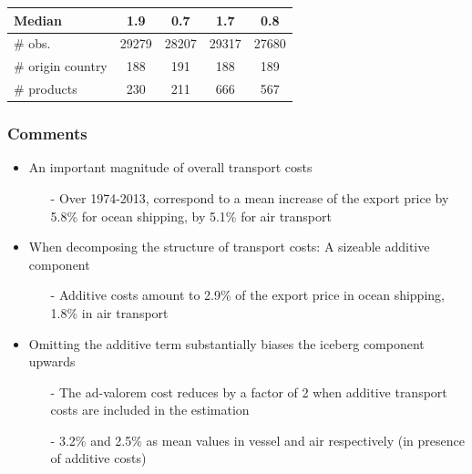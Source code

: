 \documentclass[10 pt,Helvetica, french]{beamer}
\begin{document}
\begin{frame}[label=slide_results_summary]
\begin{itemize}
\begin{table}[htbp]
{\begin{center}
\begin{tabular}{l|cc|cc}
    Median & 1.9 & 0.7 & 1.7 & 0.8 \\ \hline
        \# obs. & 29279 & 28207 & 29317 & 27680 \\
    \# origin country & 188 & 191 & 188 & 189 \\
    \# products & 230 & 211 & 666 & 567 \\  \hline \hline
  \end{tabular}
    \end{center}}
\end{table}%


\end{itemize}
\end{frame}

\begin{frame}
\frametitle{Comments}
\begin{itemize}
\item An important magnitude of overall transport costs  \vspace{0.1cm}
\begin{itemize}
\item[-] Over 1974-2013, correspond to a mean increase of the export price by 5.8\% for ocean shipping, by 5.1\% for air transport  \vspace{0.1cm}
\end{itemize}
\item When decomposing the structure of transport costs: A sizeable additive component   \vspace{0.1cm}
\begin{itemize}
\item[-] Additive costs amount to 2.9\% of the export price in ocean shipping, 1.8\% in air transport  \vspace{0.1cm}
\end{itemize}
\item Omitting the additive term substantially biases the iceberg component upwards  \vspace{0.1cm}
\begin{itemize}
\item[-] The ad-valorem cost reduces by a factor of 2 when additive transport costs are included in the estimation  \vspace{0.1cm}
\item[-] 3.2\% and 2.5\% as mean values in vessel and air respectively (in presence of additive costs) \vspace{0.1cm}
\end{itemize}
\end{itemize}
\end{frame}
\end{document}
